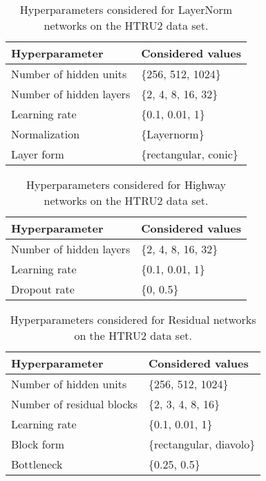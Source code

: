 \documentclass{article}
\begin{document}
\begin{table}[htp]
\begin{center}
\caption{Hyperparameters considered for LayerNorm networks on the HTRU2 data set.}
\begin{tabular}{ll}
\toprule
Hyperparameter  & Considered values \\ 
\midrule
  Number of hidden units & \{256, 512, 1024\} \\
  Number of hidden layers & \{2, 4, 8, 16, 32\} \\
  Learning rate & \{0.1, 0.01, 1\} \\
  Normalization & \{Layernorm\} \\
  Layer form & \{rectangular, conic\} \\
\bottomrule
\end{tabular}
\end{center}
\end{table}


\begin{table}[htp]
\begin{center}
\caption{Hyperparameters considered for Highway networks on the HTRU2 data set.}
\begin{tabular}{ll}
\toprule
Hyperparameter  & Considered values \\ 
\midrule
  Number of hidden layers & \{2, 4, 8, 16, 32\} \\
  Learning rate & \{0.1, 0.01, 1\} \\
  Dropout rate & \{0, 0.5\}\\
\bottomrule
\end{tabular}
\end{center}
\end{table}

\begin{table}[htp]
\begin{center}
\caption{Hyperparameters considered for Residual networks on the HTRU2 data set.}
\begin{tabular}{ll}
\toprule
Hyperparameter  & Considered values \\ 
\midrule
  Number of hidden units & \{256, 512, 1024\} \\
  Number of residual blocks & \{2, 3, 4, 8, 16\} \\
  Learning rate & \{0.1, 0.01, 1\} \\
  Block form & \{rectangular, diavolo\} \\
  Bottleneck & \{0.25, 0.5\} \\
\bottomrule
\end{tabular}
\end{center}
\end{table}
\end{document}
